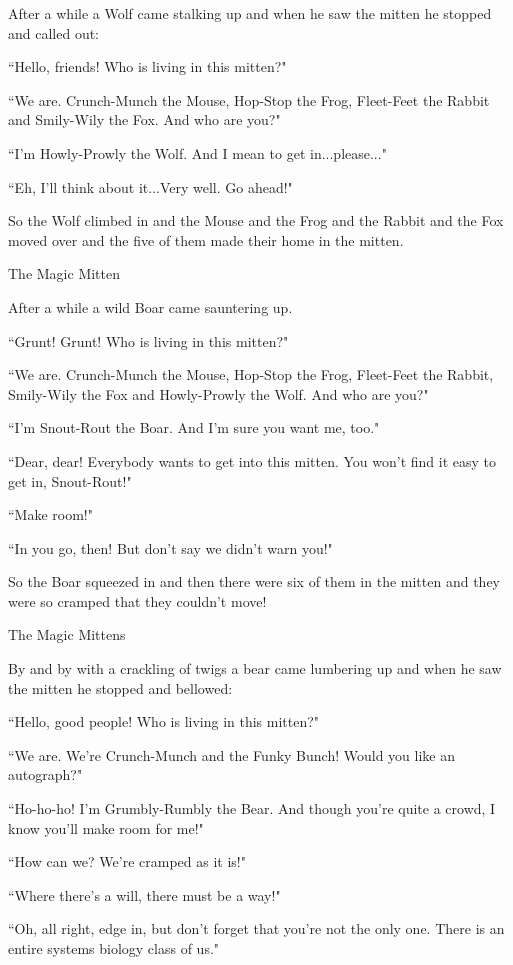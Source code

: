 \documentclass{article}
\begin{document}
After a while a Wolf came stalking up and when he saw the mitten he stopped and called out:

``Hello, friends! Who is living in this mitten?"

``We are. Crunch-Munch the Mouse, Hop-Stop the Frog, Fleet-Feet the Rabbit and Smily-Wily the Fox. And who are you?"

``I'm Howly-Prowly the Wolf. And I mean to get in...please..."

``Eh, I'll think about it...Very well. Go ahead!"

So the Wolf climbed in and the Mouse and the Frog and the Rabbit and the Fox moved over and the five of them made their home in the mitten.

The Magic Mitten

After a while a wild Boar came sauntering up.

``Grunt! Grunt! Who is living in this mitten?"

``We are. Crunch-Munch the Mouse, Hop-Stop the Frog, Fleet-Feet the Rabbit, Smily-Wily the Fox and Howly-Prowly the Wolf. And who are you?"

``I'm Snout-Rout the Boar. And I'm sure you want me, too."

``Dear, dear! Everybody wants to get into this mitten. You won't find it easy to get in, Snout-Rout!"

``Make room!"

``In you go, then! But don't say we didn't warn you!"

So the Boar squeezed in and then there were six of them in the mitten and they were so cramped that they couldn't move!

The Magic Mittens

By and by with a crackling of twigs a bear came lumbering up and when he saw the mitten he stopped and bellowed:

``Hello, good people! Who is living in this mitten?"

``We are. We're Crunch-Munch and the Funky Bunch! Would you like an autograph?"

``Ho-ho-ho! I'm Grumbly-Rumbly the Bear. And though you're quite a crowd, I know you'll make room for me!"

``How can we? We're cramped as it is!"

``Where there's a will, there must be a way!"

``Oh, all right, edge in, but don't forget that you're not the only one. There is an entire systems biology class of us."
\end{document}
